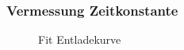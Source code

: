 \documentclass[12pt,twoside,a4paper]{scrartcl}
\begin{document}
		\subsubsection{Vermessung Zeitkonstante}
		\label{Daten::Kondensator}
			\begin{figure}[H]
				\centering
				\begin{minipage}{0.4 \textwidth}
				\caption{Fit Entladekurve}
				\end{minipage}
				\begin{minipage}{0.4 \textwidth}
					\fbox{
}
\end{minipage}
\end{figure}
\end{document}
